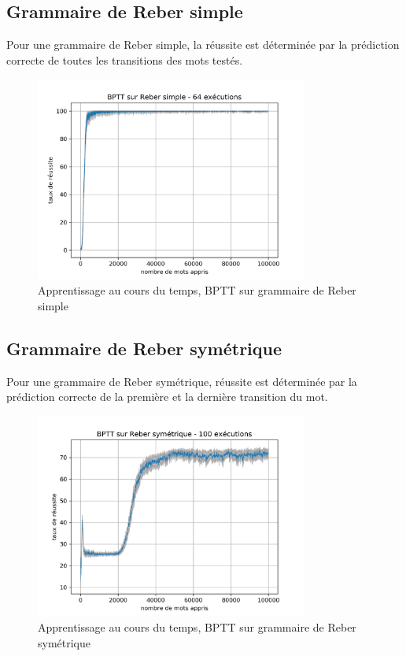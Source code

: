 \subsection{Grammaire de Reber simple}
Pour une grammaire de Reber simple, la réussite est déterminée par la prédiction
correcte de toutes les transitions des mots testés.

\begin{figure}[!ht]
\begin{center}
\includegraphics[width=0.8\textwidth]{images/results/bptt_simplereber_ls30_lr01.png}
\caption{Apprentissage au cours du temps, BPTT sur grammaire de Reber simple}
\end{center}
\end{figure}

\subsection{Grammaire de Reber symétrique}
Pour une grammaire de Reber symétrique, réussite est déterminée par la prédiction
correcte de la première et la dernière transition du mot.

\begin{figure}[!ht]
\begin{center}
\includegraphics[width=0.8\textwidth]{images/results/bptt_doublereber_ls30_lr01.png}
\caption{Apprentissage au cours du temps, BPTT sur grammaire de Reber symétrique}
\end{center}
\end{figure}
